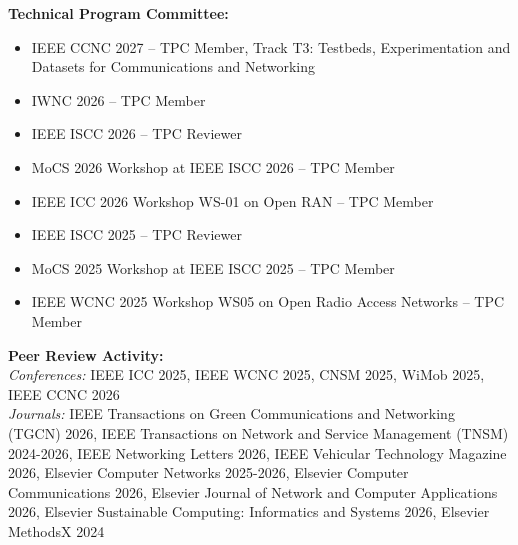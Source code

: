 \documentclass[a4paper,11pt]{article}
\begin{document}
\small{
\textbf{Technical Program Committee:}
\begin{itemize}[leftmargin=*, labelsep=1mm, itemsep=0.5mm]
\item[--] IEEE CCNC 2027 -- TPC Member, Track T3: Testbeds, Experimentation and Datasets for Communications and Networking
\item[--] IWNC 2026 -- TPC Member
\item[--] IEEE ISCC 2026 -- TPC Reviewer
\item[--] MoCS 2026 Workshop at IEEE ISCC 2026 -- TPC Member
\item[--] IEEE ICC 2026 Workshop WS-01 on Open RAN -- TPC Member
\item[--] IEEE ISCC 2025 -- TPC Reviewer
\item[--] MoCS 2025 Workshop at IEEE ISCC 2025 -- TPC Member
\item[--] IEEE WCNC 2025 Workshop WS05 on Open Radio Access Networks -- TPC Member
\end{itemize}

\vspace{1mm}
\textbf{Peer Review Activity:}\\
\textit{Conferences:} IEEE ICC 2025, IEEE WCNC 2025, CNSM 2025, WiMob 2025, IEEE CCNC 2026\\
\textit{Journals:} IEEE Transactions on Green Communications and Networking (TGCN) 2026, IEEE Transactions on Network and Service Management (TNSM) 2024-2026, IEEE Networking Letters 2026, IEEE Vehicular Technology Magazine 2026, Elsevier Computer Networks 2025-2026, Elsevier Computer Communications 2026, Elsevier Journal of Network and Computer Applications 2026, Elsevier Sustainable Computing: Informatics and Systems 2026, Elsevier MethodsX 2024
}

\end{document}

